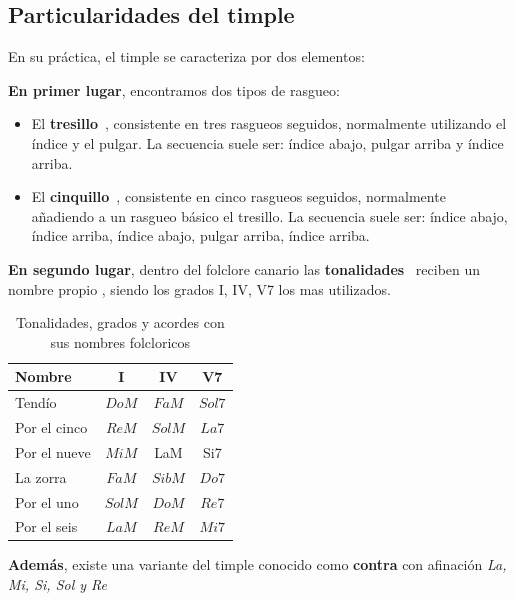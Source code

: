 \subsection{Particularidades del timple}
\label{c:fundamentos_timple}

En su práctica, el timple se caracteriza por dos elementos:

\textbf{En primer lugar}, encontramos dos tipos de rasgueo:
\begin{itemize}
    \item El \textbf{tresillo}~\cite{pedroizquierdo_tresillo}, consistente en tres rasgueos seguidos, normalmente utilizando el índice y el pulgar. La secuencia suele ser: índice abajo, pulgar arriba y índice arriba.
    \item El \textbf{cinquillo}~\cite{pedroizquierdo_cinquillo}, consistente en cinco rasgueos seguidos, normalmente añadiendo a un rasgueo básico el tresillo. La secuencia suele ser: índice abajo, índice arriba, índice abajo, pulgar arriba, índice arriba.
\end{itemize}

\textbf{En segundo lugar}, dentro del folclore canario las \textbf{tonalidades}~\cite{timplismo_tonalidades}\cite{raquel_tonalidades_video} reciben un nombre propio , siendo los grados I, IV, V7 los mas utilizados.

\begin{table}[H]
    \centering
    \scriptsize
    \begin{tabular}{l c c c}
    \hline
    \textbf{Nombre} & \textbf{I} & \textbf{IV} & \textbf{V7} \\
    \hline
    Tendío       & $DoM$ & $FaM$ & $Sol7$ \\
    Por el cinco & $ReM$ & $SolM$ & $La7$ \\
    Por el nueve & $MiM$ & LaM & Si7 \\
    La zorra     & $FaM$ & $SibM$ & $Do7$ \\
    Por el uno   & $SolM$ & $DoM$ & $Re7$ \\
    Por el seis  & $LaM$ & $ReM$ & $Mi7$ \\
    \hline
    \end{tabular}
    \caption{Tonalidades, grados y acordes con sus nombres folcloricos}\label{tab:tonalidades_timple}
\end{table}

\textbf{Además}, existe una variante del timple conocido como \textbf{contra} con afinación \textit{La, Mi, Si, Sol y Re}